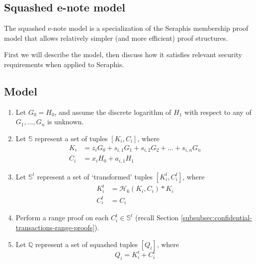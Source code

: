 \begin{appendices}

\renewcommand{\theFancyVerbLine}{%
	\textcolor{red}{\small
		\arabic{FancyVerbLine}}}

\section{Squashed e-note model}
\label{appendix:squashed-e-note-model}

The squashed e-note model is a specialization of the Seraphis membership proof model that allows relatively simpler (and more efficient) proof structures.

First we will describe the model, then discuss how it satisfies relevant security requirements when applied to Seraphis.


\subsection{Model}
\label{appendix:squashed-e-note-model-model}

\begin{enumerate}
    \item Let $G_0 = H_0$, and assume the discrete logarithm of $H_1$ with respect to any of $G_1,...,G_n$ is unknown.

    \item Let $\mathbb{S}$ represent a set of tuples $[K_i, C_i]$, where\vspace{.115cm}
    \begin{align*}
        K_i &= z_i G_0 + s_{i,1} G_1 + s_{i,2} G_2 + ... + s_{i,n} G_n \\
        C_i &= x_i H_0 + a_{i,1} H_1
    \end{align*}

    \item Let $\mathbb{S}^t$ represent a set of `transformed' tuples $[K^t_i, C^t_i]$, where\vspace{.115cm}
    \begin{align*}
        K^t_i &= \mathcal{H}_6(K_i, C_i)*K_i \\
        C^t_i &= C_i
    \end{align*}

    \item Perform a range proof on each $C^t_i \in \mathbb{S}^t$ (recall Section \ref{subsubsec:confidential-transactions-range-proofs}).

    \item Let $\mathbb{Q}$ represent a set of squashed tuples $[Q_i]$, where\vspace{.115cm}
    \[Q_i = K^t_i + C^t_i\]


\end{enumerate}
\end{appendices}
